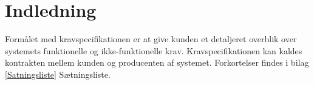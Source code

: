 \chapter{Indledning}\label{Formal}
Formålet med kravspecifikationen er at give kunden et detaljeret overblik over systemets funktionelle og ikke-funktionelle krav. Kravspecifikationen kan kaldes kontrakten mellem kunden og producenten af systemet. Forkortelser findes i bilag \ref{Satningsliste} Sætningsliste. 